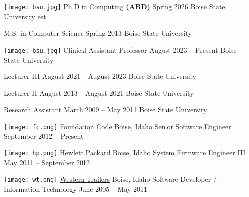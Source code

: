 \documentclass{shanep}
\begin{document}

\begin{itemize}

  \ressubheading
      {\texttt{[image: bsu.jpg]}}
      {Ph.D in Computing \textbf{(ABD)}}
      {Spring 2026}
      {Boise State University}
      {est.}

  \ressubheading
      {}
      {M.S. in Computer Science}
      {Spring 2013}
      {Boise State University}
      {}

\end{itemize} %

\begin{itemize}
  \ressubheading
      {\texttt{[image: bsu.jpg]}}
      {Clinical Assistant Professor}
      {August 2023 -- Present}
      {Boise State University}
      {}

  \ressubheading
      {}
      {Lecturer III}
      {August 2021 -- August 2023}
      {Boise State University}
      {}

  \ressubheading
      {}
      {Lecturer II}
      {August 2013 -- August 2021}
      {Boise State University}
      {}

  \ressubheading
      {}
      {Research Assistant}
      {March 2009 -- May 2011}
      {Boise State University}
      {}

\end{itemize}

\begin{itemize}

  \ressubheading
      {\texttt{[image: fc.png]}}
      {{\href{https://foundationcode.com}{Foundation Code}}}
      {Boise, Idaho}
      {Senior Software Engineer}
      {September 2012 -- Present}

   \ressubheading
       {\texttt{[image: hp.png]}}
       {{\href{https://hp.com}{Hewlett Packard}}}
       {Boise, Idaho}
       {System Firmware Engineer III}
       {May 2011 -- September 2012}

   \ressubheading
       {\texttt{[image: wt.png]}}
       {{\href{http://westerntrailer.com}{Western Trailers}}}
       {Boise, Idaho}
       {Software Developer / Information Technology}
       {June 2005 -- May 2011}

\end{itemize}
\end{document}
